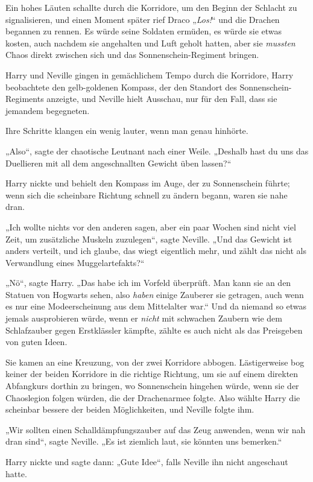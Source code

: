 {Ein hohes Läuten schallte durch die Korridore, um den Beginn der Schlacht zu signalisieren, und einen Moment später rief Draco „\emph{Los!}“ und die Drachen begannen zu rennen. Es würde seine Soldaten ermüden, es würde sie etwas kosten, auch nachdem sie angehalten und Luft geholt hatten, aber sie \emph{mussten} Chaos direkt zwischen sich und das Sonnenschein-Regiment bringen.

Harry und Neville gingen in gemächlichem Tempo durch die Korridore, Harry beobachtete den gelb-goldenen Kompass, der den Standort des Sonnenschein-Regiments anzeigte, und Neville hielt Ausschau, nur für den Fall, dass sie jemandem begegneten.

Ihre Schritte klangen ein wenig lauter, wenn man genau hinhörte.

„Also“, sagte der chaotische Leutnant nach einer Weile. „Deshalb hast du uns das Duellieren mit all dem angeschnallten Gewicht üben lassen?“

Harry nickte und behielt den Kompass im Auge, der zu Sonnenschein führte; wenn sich die scheinbare Richtung schnell zu ändern begann, waren sie nahe dran.

„Ich wollte nichts vor den anderen sagen, aber ein paar Wochen sind nicht viel Zeit, um zusätzliche Muskeln zuzulegen“, sagte Neville. „Und das Gewicht ist anders verteilt, und ich glaube, das wiegt eigentlich mehr, und zählt das nicht als Verwandlung eines Muggelartefakts?“

„Nö“, sagte Harry. „Das habe ich im Vorfeld überprüft. Man kann sie an den Statuen von Hogwarts sehen, also \emph{haben} einige Zauberer sie getragen, auch wenn es nur eine Modeerscheinung aus dem Mittelalter war.“ Und da niemand so etwas jemals ausprobieren würde, wenn er \emph{nicht} mit schwachen Zaubern wie dem Schlafzauber gegen Erstklässler kämpfte, zählte es auch nicht als das Preisgeben von guten Ideen.

Sie kamen an eine Kreuzung, von der zwei Korridore abbogen. Lästigerweise bog keiner der beiden Korridore in die richtige Richtung, um sie auf einem direkten Abfangkurs dorthin zu bringen, wo Sonnenschein hingehen würde, wenn sie der Chaoslegion folgen würden, die der Drachenarmee folgte. Also wählte Harry die scheinbar bessere der beiden Möglichkeiten, und Neville folgte ihm.

„Wir sollten einen Schalldämpfungszauber auf das Zeug anwenden, wenn wir nah dran sind“, sagte Neville. „Es ist ziemlich laut, sie könnten uns bemerken.“

Harry nickte und sagte dann: „Gute Idee“, falls Neville ihn nicht angeschaut hatte.

}
